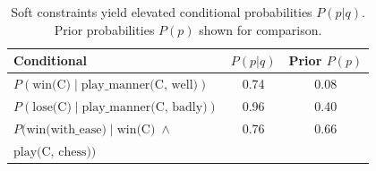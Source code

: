 \begin{table}[ht!]
\centering
\small
\begin{tabular}{@{}lcc@{}}
\toprule
\textbf{Conditional} & \textbf{$P(p|q)$} & \textbf{Prior $P(p)$} \\
\midrule
$P(\text{win(C)} \mid \text{play\_manner(C, well)})$ & 0.74 & 0.08 \\
$P(\text{lose(C)} \mid \text{play\_manner(C, badly)})$ & 0.96 & 0.40 \\
$P(\text{win(with\_ease)} \mid \text{win(C)} \; \land$ & 0.76 & 0.66 \\
\phantom{$P(\text{win(with\_ease)} \mid$} $\text{play(C, chess)})$ &  &  \\
\bottomrule
\end{tabular}
\vspace{-0.5em}
\caption{\small Soft constraints yield elevated conditional probabilities $P(p|q)$. Prior probabilities $P(p)$ shown for comparison.}
\label{tab:soft-inference}
\end{table}
